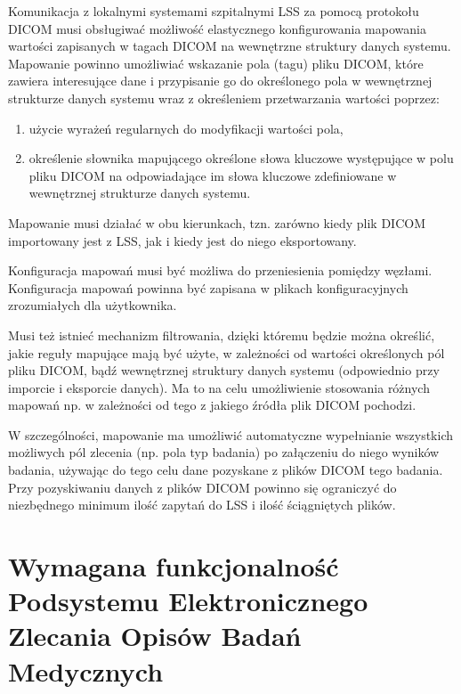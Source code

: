 \documentclass[a4paper]{report}
\begin{document}
Komunikacja z lokalnymi systemami szpitalnymi LSS za pomocą protokołu DICOM musi obsługiwać możliwość elastycznego konfigurowania mapowania wartości zapisanych w tagach DICOM na wewnętrzne struktury danych systemu. Mapowanie powinno umożliwiać wskazanie pola (tagu) pliku DICOM, które zawiera interesujące dane i przypisanie go do określonego pola w wewnętrznej strukturze danych systemu wraz z określeniem przetwarzania wartości poprzez:
\begin{enumerate}
  \item użycie wyrażeń regularnych do modyfikacji wartości pola,
  \item określenie słownika mapującego określone słowa kluczowe występujące w polu pliku DICOM na odpowiadające im słowa kluczowe zdefiniowane w wewnętrznej strukturze danych systemu.
\end{enumerate}

Mapowanie musi działać w obu kierunkach, tzn. zarówno kiedy plik DICOM importowany jest z LSS, jak i kiedy jest do niego eksportowany.

Konfiguracja mapowań musi być możliwa do przeniesienia pomiędzy węzłami. Konfiguracja mapowań powinna być zapisana w plikach konfiguracyjnych zrozumiałych dla użytkownika.

Musi też istnieć mechanizm filtrowania, dzięki któremu będzie można określić, jakie reguły mapujące mają być użyte, w zależności od wartości określonych pól pliku DICOM, bądź wewnętrznej struktury danych systemu (odpowiednio przy imporcie i eksporcie danych). Ma to na celu umożliwienie stosowania różnych mapowań np. w zależności od tego z jakiego źródła plik DICOM pochodzi.

W szczególności, mapowanie ma umożliwić automatyczne wypełnianie wszystkich możliwych pól zlecenia (np. pola typ badania) po załączeniu do niego wyników badania, używając do tego celu dane pozyskane z plików DICOM tego badania. Przy pozyskiwaniu danych z plików DICOM powinno się ograniczyć do niezbędnego minimum ilość zapytań do LSS i ilość ściągniętych plików.

\chapter[Podsystem Elektronicznego Zlecania Opisów Badań]{Wymagana funkcjonalność Podsystemu Elektronicznego Zlecania Opisów Badań Medycznych}
\end{document}
